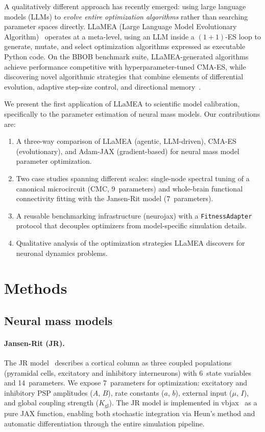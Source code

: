 \documentclass[11pt,a4paper]{article}
\begin{document}
A qualitatively different approach has recently emerged: using large language models (LLMs) to \emph{evolve entire optimization algorithms} rather than searching parameter spaces directly.
LLaMEA (Large Language Model Evolutionary Algorithm)~\citep{vanStein2025} operates at a meta-level, using an LLM inside a $(1+1)$-ES loop to generate, mutate, and select optimization algorithms expressed as executable Python code.
On the BBOB benchmark suite, LLaMEA-generated algorithms achieve performance competitive with hyperparameter-tuned CMA-ES, while discovering novel algorithmic strategies that combine elements of differential evolution, adaptive step-size control, and directional memory~\citep{vanStein2025}.

We present the first application of LLaMEA to scientific model calibration, specifically to the parameter estimation of neural mass models.
Our contributions are:
\begin{enumerate}
    \item A three-way comparison of LLaMEA (agentic, LLM-driven), CMA-ES (evolutionary), and Adam-JAX (gradient-based) for neural mass model parameter optimization.
    \item Two case studies spanning different scales: single-node spectral tuning of a canonical microcircuit (CMC, 9~parameters) and whole-brain functional connectivity fitting with the Jansen-Rit model (7~parameters).
    \item A reusable benchmarking infrastructure (neurojax) with a \texttt{FitnessAdapter} protocol that decouples optimizers from model-specific simulation details.
    \item Qualitative analysis of the optimization strategies LLaMEA discovers for neuronal dynamics problems.
\end{enumerate}


\section{Methods}

\subsection{Neural mass models}

\paragraph{Jansen-Rit (JR).}
The JR model~\citep{JansenRit1995} describes a cortical column as three coupled populations (pyramidal cells, excitatory and inhibitory interneurons) with 6~state variables and 14~parameters.
We expose 7~parameters for optimization: excitatory and inhibitory PSP amplitudes ($A$, $B$), rate constants ($a$, $b$), external input ($\mu$, $I$), and global coupling strength ($K_\text{gl}$).
The JR model is implemented in vbjax~\citep{vbjax} as a pure JAX function, enabling both stochastic integration via Heun's method and automatic differentiation through the entire simulation pipeline.
\end{document}
